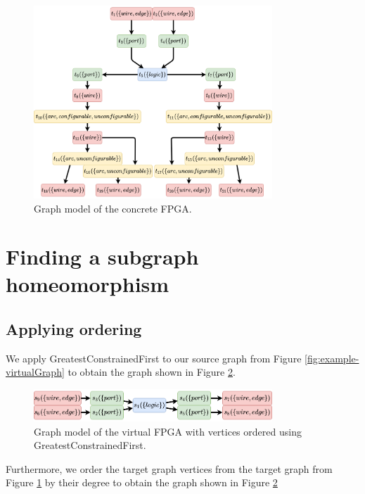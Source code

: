 \begin{figure}[h]
\centering
\includegraphics[width=0.8\textwidth]{images/endToEnd/concreteFPGAGraph.png}
\caption{Graph model of the concrete FPGA.}
\label{fig:example-concreteGraph}
\end{figure}	


\section{Finding a subgraph homeomorphism}
\subsection{Applying ordering}
We apply GreatestConstrainedFirst to our source graph from Figure \ref{fig:example-virtualGraph} to obtain the graph shown in Figure \ref{fig:example-virtualGraphOrdered}.

\begin{figure}
\centering
\includegraphics[width=0.8\textwidth]{images/endToEnd/virtualFPGAGraphOrdered.png}
\caption{Graph model of the virtual FPGA with vertices ordered using GreatestConstrainedFirst.}
\label{fig:example-virtualGraphOrdered}
\end{figure}

Furthermore, we order the target graph vertices from the target graph from Figure \ref{fig:example-concreteGraph}
by their degree to obtain the graph shown in Figure \ref{fig:example-virtualGraphOrdered}


